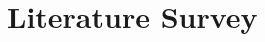\documentclass[conference]{IEEEtran}
\begin{document}
\section{Literature Survey}








\end{document}
